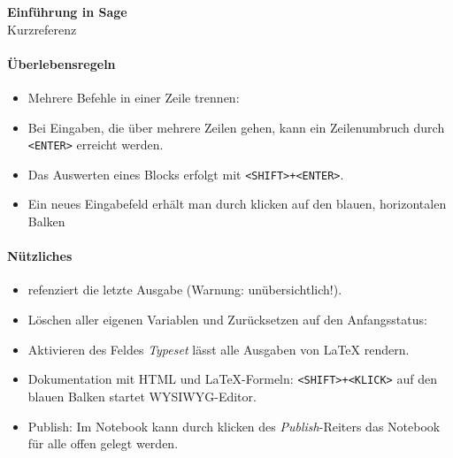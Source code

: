 \documentclass[a4paper,9pt,DIV15,twocolumn]{scrartcl}
\begin{document}
\begin{center}
        \textbf{\LARGE Einf\"uhrung in Sage}\\
        {\large Kurzreferenz}
\end{center}


\paragraph{Überlebensregeln}
\begin{itemize}
\item Mehrere Befehle in einer Zeile trennen: {\color{blue}\isage{;}}
\item Bei Eingaben, die über mehrere Zeilen gehen, kann ein
  Zeilenumbruch durch {\color{blue} \verb~<ENTER>~} erreicht werden.
\item Das Auswerten eines Blocks erfolgt mit {\color{blue} \verb~<SHIFT>+<ENTER>~}.
\item Ein neues Eingabefeld erhält man durch klicken auf den blauen, horizontalen Balken
\end{itemize}
\paragraph{Nützliches}
\begin{itemize}
\item {\color{blue} \isage{_} } refenziert die letzte Ausgabe (Warnung: unübersichtlich!).
\item Löschen aller eigenen Variablen und Zurücksetzen auf den Anfangsstatus: {\color{blue} }
\item Aktivieren des Feldes \emph{Typeset} lässt alle Ausgaben von \LaTeX{} rendern.
\item Dokumentation mit HTML und \LaTeX{}-Formeln:{\color{blue} \verb~<SHIFT>+<KLICK>~ }auf den blauen Balken startet WYSIWYG-Editor.
\item Publish: Im Notebook kann durch klicken des \emph{Publish}-Reiters das Notebook für alle offen gelegt werden. 
\end{itemize}
\end{document}
